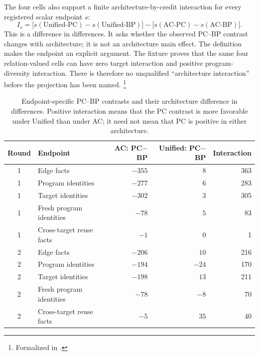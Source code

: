 \documentclass[11pt,openany]{report}
\begin{document}
The four cells also support a finite architecture-by-credit interaction for
every registered scalar endpoint $s$:
\[
 I_s =
   \bigl[s(\text{Unified-PC})-s(\text{Unified-BP})\bigr]
   -\bigl[s(\text{AC-PC})-s(\text{AC-BP})\bigr].
\]
This is a difference in differences.  It asks whether the observed PC--BP
contrast changes with architecture; it is not an architecture main effect.
The definition  makes the endpoint an
explicit argument.  The fixture
 proves
that the same four relation-valued cells can have zero target interaction and
positive program-diversity interaction.  There is therefore no unqualified
``architecture interaction'' before the projection has been named.%
\footnote{Formalized in
.}

\begin{table}[htbp]
\centering
\caption{Endpoint-specific PC--BP contrasts and their architecture
difference in differences.  Positive interaction means that the PC contrast
is more favorable under Unified than under AC; it need not mean that PC is
positive in either architecture.}
\label{tab:architecture-relational-interactions}
\small
\begin{tabular}{clrrr}
\toprule
Round & Endpoint & AC: PC$-$BP & Unified: PC$-$BP & Interaction \\
\midrule
1 & Edge facts                 & $-355$ & $  8$ & 363 \\
1 & Program identities         & $-277$ & $  6$ & 283 \\
1 & Target identities          & $-302$ & $  3$ & 305 \\
1 & Fresh program identities   & $ -78$ & $  5$ &  83 \\
1 & Cross-target reuse facts   & $  -1$ & $  0$ &   1 \\
\midrule
2 & Edge facts                 & $-206$ & $ 10$ & 216 \\
2 & Program identities         & $-194$ & $-24$ & 170 \\
2 & Target identities          & $-198$ & $ 13$ & 211 \\
2 & Fresh program identities   & $ -78$ & $ -8$ &  70 \\
2 & Cross-target reuse facts   & $  -5$ & $ 35$ &  40 \\
\bottomrule
\end{tabular}
\end{table}
\end{document}

